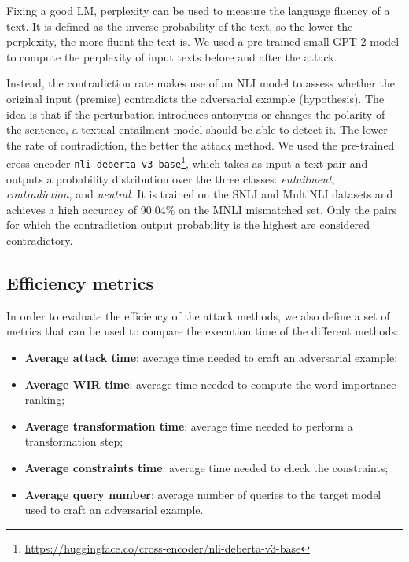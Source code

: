 Fixing a good LM, perplexity can be used to measure the language fluency of a text. 
It is defined as the inverse probability of the text, so the lower the perplexity, the more fluent the text is.
We used a pre-trained small GPT-2 \cite{gpt2} model to compute the perplexity of input texts before and after the attack.

Instead, the contradiction rate makes use of an NLI model to assess whether the original input (premise) contradicts the adversarial example (hypothesis).
The idea is that if the perturbation introduces antonyms or changes the polarity of the sentence, a textual entailment model should be able to detect it. The lower the rate of contradiction, the better the attack method.
We used the pre-trained cross-encoder \texttt{nli-deberta-v3-base}\footnote{\url{https://huggingface.co/cross-encoder/nli-deberta-v3-base}}, which takes as input a text pair and outputs a probability distribution over the three classes: \emph{entailment}, \emph{contradiction}, and \emph{neutral}.
It is trained on the SNLI \cite{journals/corr/BowmanAPM15} and MultiNLI \cite{journals/corr/WilliamsNB17} datasets and achieves a high accuracy of 90.04\% on the MNLI mismatched set.
Only the pairs for which the contradiction output probability is the highest are considered contradictory.


\subsection{Efficiency metrics}\label{subsec:performance-metrics}

In order to evaluate the efficiency of the attack methods, we also define a set of metrics that can be used to compare the execution time of the different methods:
\begin{itemize}
    \item \textbf{Average attack time}: average time needed to craft an adversarial example;
    \item \textbf{Average WIR time}: average time needed to compute the word importance ranking;
    \item \textbf{Average transformation time}: average time needed to perform a transformation step;
    \item \textbf{Average constraints time}: average time needed to check the constraints;
    \item \textbf{Average query number}: average number of queries to the target model used to craft an adversarial example.
\end{itemize}

